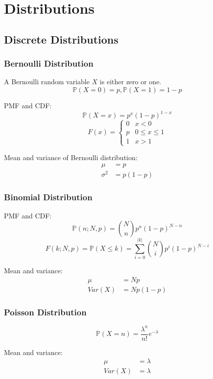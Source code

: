 \section{Distributions}

\subsection{Discrete Distributions}
\subsubsection{Bernoulli Distribution}
A Bernoulli random variable $X$ is either zero or one.
\[
\mathbb{P}(X = 0) = p,  \mathbb{P}(X = 1) = 1-p 
\]

PMF and CDF:
\[
        \mathbb{P}(X=x) = p^x(1-p)^{1-x}
\]
\[
        F(x) = \begin{cases}
            0& x<0\\
            p& 0 \leq x\leq 1\\
            1& x >1
            \end{cases}     
\]

Mean and variance of Bernoulli distribution:
\[
    \begin{aligned}
        \mu &= p\\
        \sigma^2 &= p(1-p)       
    \end{aligned}
\]



\subsubsection{Binomial Distribution}
PMF and CDF:
\[
    \mathbb{P}(n;N,p) = \binom N n p^n(1-p)^{N-n}
\]
\[
    F(k;N,p) = \mathbb{P}(X\leq k) = \sum_{i=0}^{|k|} \binom N i p^i(1-p)^{N-i}
\]

Mean and variance:
\[
    \begin{aligned}
        \mu &= Np\\
        Var(X) &= Np(1-p)
    \end{aligned}
\]

\subsubsection{Poisson Distribution}
\[
    \mathbb{P}(X=n) = \frac{\lambda^n}{n!}e^{-\lambda}
\]

Mean and variance:
\[
    \begin{aligned}
        \mu &= \lambda\\
        Var(X) &= \lambda
    \end{aligned}
\]

